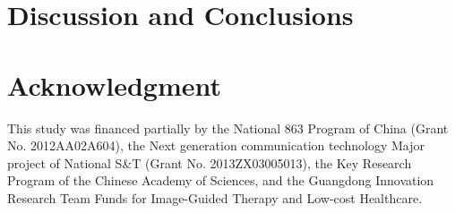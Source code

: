 \documentclass[journal]{IEEEtran}
\begin{document}
\section{Discussion and Conclusions}








\section*{Acknowledgment}
This study was financed partially by the National 863 Program of China (Grant No. 2012AA02A604), the Next generation communication technology Major project of National S\&T (Grant No. 2013ZX03005013), the Key Research Program of the Chinese Academy of Sciences, and the Guangdong Innovation Research Team Funds for Image-Guided Therapy and Low-cost Healthcare. 
\ifCLASSOPTIONcaptionsoff
  \newpage
\fi



%
%
%
  

  
  
\end{document}
